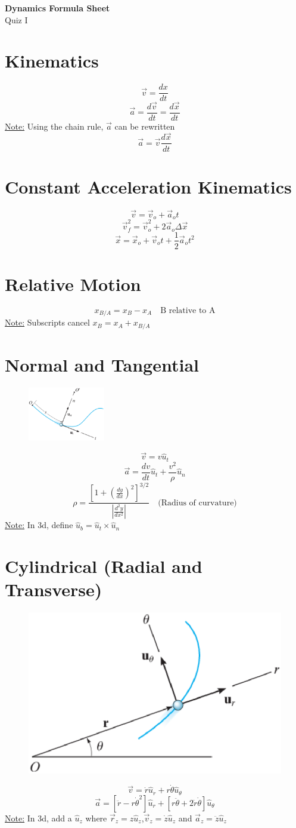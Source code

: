 \documentclass[10pt, fleqn]{article}
\begin{document}
\begin{center}
    \Large \textbf{Dynamics Formula Sheet} \\
    \normalsize Quiz I
\end{center}

\begin{multicols}{2}

\section*{Kinematics}
\[\vec{v}=\frac{dx}{dt}\]
\[\vec{a}=\frac{d\vec{v}}{dt}=\frac{d\vec{x}}{dt}\]
\underline{Note:} Using the chain rule, $\vec{a}$ can be rewritten
\[\vec{a}=\vec{v}\frac{d\vec{x}}{dt}\]
\section*{Constant Acceleration Kinematics}
\[\vec{v}=\vec{v}_o+\vec{a}_ot\]
\[\vec{v}_f^2=\vec{v}_o^2+2\vec{a}_o\Delta \vec{x}\]
\[\vec{x}=\vec{x}_o+\vec{v}_ot+\frac{1}{2}\vec{a}_ot^2\]
\section*{Relative Motion}
\[x_{B/A}=x_B-x_A \quad \text{B relative to A}\]
\underline{Note:} Subscripts cancel $x_B=x_A+x_{B/A}$
\section*{Normal and Tangential}
\begin{figure}[H]
    \includegraphics[width=0.3\textwidth]{normal and tangential.png}
\end{figure}
\[\vec{v}=v\hat{u}_t\]
\[\vec{a}=\frac{dv}{dt}\hat{u}_t+\frac{v^2}{\rho}\hat{u}_n\]
\[\rho = \frac{\left[1+\left(\frac{dy}{dx}\right)^2 \right]^{3/2}}{\left|\frac{d^2y}{dx^2} \right|} \quad \text{(Radius of curvature)}\]
\underline{Note:} In 3d, define $\hat{u}_b=\hat{u}_t \times \hat{u}_n$ 
\section*{Cylindrical (Radial and Transverse)}
\begin{figure}[H]
    \includegraphics[width=0.3 \textwidth]{cylindrical.png}
\end{figure}
\[\vec{v}=\dot{r}\hat{u}_r+r\dot{\theta}\hat{u}_{\theta}\]
\[\vec{a}=\left[\ddot{r}-r\dot{\theta}^2\right]\hat{u}_r+\left[r\ddot{\theta}+2\dot{r}\dot{\theta}\right]\hat{u}_{\theta}\]
\underline{Note:} In 3d, add a $\hat{u}_z$ where $\vec{r}_z=z\hat{u}_z$,$\vec{v}_z=\dot{z}\hat{u}_z$ and $\vec{a}_z=\ddot{z}\hat{u}_z$

\end{multicols}
\end{document}
